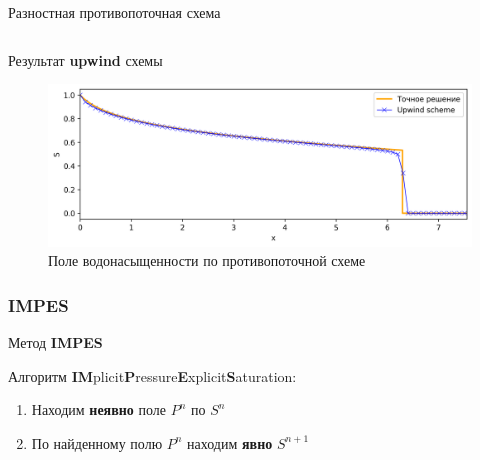\documentclass[14pt, aspectratio=169]{beamer}
\begin{document}
\begin{frame} {Разностная противопоточная схема}
\begin{columns}
\begin{center}
{
            }
        \end{center}
    \end{columns}

\end{frame}

\begin{frame} {Результат \textbf{upwind} схемы}

    \begin{figure}
        \includegraphics[width=\linewidth]{upwind-solution-0.png}
        \caption{Поле водонасыщенности по противопоточной схеме}
    \end{figure}

\end{frame}

\subsubsection{IMPES}

\begin{frame} {Метод \textbf{IMPES}}

    Алгоритм \textbf{IM}plicit\textbf{P}ressure\textbf{E}xplicit\textbf{S}aturation:

    \begin{enumerate}
        \item Находим \textbf{неявно} поле $P^n$ по $S^n$
        \item По найденному полю $P^n$ находим \textbf{явно} $S^{n+1}$
    \end{enumerate}
    
\end{frame}
\end{document}
